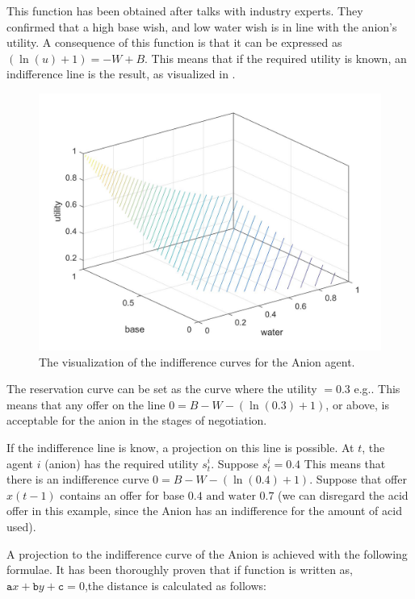 This function has been obtained after talks with industry experts. They confirmed that a high base wish, and low water wish is in line with the anion's utility. A consequence of this function is that it can be expressed as $ (\ln(u)+1) = -W+B$. This means that if the required utility is known, an indifference line is the result, as visualized in .

\begin{figure}[h]
	\centering
	\includegraphics[width=0.7\linewidth]{img/Anion_utility_contour}
	\caption{The visualization of the indifference curves for the Anion agent.}
	\label{fig:anionutilitycontour}
\end{figure}

The reservation curve can be set as the curve where the utility $= 0.3$ e.g.. This means that any offer on the line $0 = B - W - (\ln(0.3)+1)$, or above, is acceptable for the anion in the stages of negotiation.


If the indifference line is know, a projection on this line is possible. 
At $t$, the agent $i$ (anion) has the required utility $s^i_t$. Suppose $s^i_t = 0.4$ This means that there is an indifference curve $0 = B - W - (\ln(0.4)+1)$. Suppose that offer $x(t-1)$ contains an offer for base $0.4 \text{ and water } 0.7$ (we can disregard the acid offer in this example, since the Anion has an indifference for the amount of acid used). 

A projection to the indifference curve of the Anion is achieved with the following formulae. It has been thoroughly proven that if function is written as, $\texttt{a} x + \texttt{b} y + \texttt{c} = 0$,the distance is calculated as follows:

